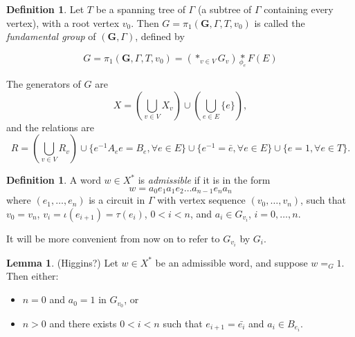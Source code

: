 \documentclass[a4paper]{article}
\newcommand{\fgoagog}{\pi_1(\mathbf{G},\Gamma,T,v_0)}					%
\theoremstyle{plain}
\theoremstyle{definition}
\newtheorem{lemma}[theorem]{Lemma}
\newtheorem{definition}[theorem]{Definition}
\begin{document}
\begin{definition}
Let $T$ be a spanning tree of $\Gamma$ (a subtree of $\Gamma$ containing every vertex), with a root vertex $v_0$. Then $G = \fgoagog$ is called the {\it fundamental group} of $(\mathbf{G},\Gamma)$, defined by

\begin{equation}
G = \fgoagog = \left( \ast_{v \in V} G_v \right) \underset{\phi_e}{\ast} F(E)
\end{equation}

The generators of $G$ are
\[ X = \left( \bigcup_{v \in V}X_v \right) \cup \left( \bigcup_{e \in E}\{e\} \right),\]
and the relations are 
\[ R = \left( \bigcup_{v \in V}R_v \right) \cup \{e^{-1}A_ee = B_e,  \forall e \in E\} \cup \{ e^{-1} = \bar{e}, \forall e \in E\} \cup \{ e = 1, \forall e \in T \}.\]
\end{definition}

\begin{definition}
A word $w \in X^{\ast}$ is {\it admissible} if it is in the form
\[ w = a_0 e_1 a_1 e_2 \dots a_{n-1} e_n a_n \]
where $(e_1,\dots,e_n)$ is a circuit in $\Gamma$ with vertex sequence $(v_0,\dots,v_n)$, such that $v_0 = v_n$, $v_i = \iota(e_{i+1})=\tau(e_i)$, $0 < i < n$, and $a_i \in G_{v_i}$, $i=0,\dots,n$.
\end{definition}

It will be more convenient from now on to refer to $G_{v_i}$ by $G_i$.

\begin{lemma}
\label{trivialnormalform}
(Higgins?)
Let $w \in X^{\ast}$ be an admissible word, and suppose $w =_G 1$. Then either:
\begin{itemize}
	\item $n=0$ and $a_0=1$ in $G_{v_0}$, or
	\item $n > 0$ and there exists $0<i<n$ such that $e_{i+1}=\bar{e_i}$ and $a_i \in B_{e_i}$.
\end{itemize}
\end{lemma}
\end{document}
